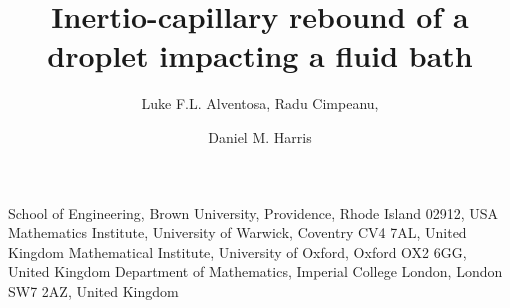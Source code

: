 \documentclass{jfm}
\begin{document}
\newtheorem{lemma}{Lemma}
\newtheorem{corollary}{Corollary}
\newcommand{\setbackgroundcolour}{\pagecolor[rgb]{0.19,0.19,.19}}  
\newcommand{\settextcolour}{\color[rgb]{0.77,0.77,0.77}}    
\newcommand{\invertbackgroundtext}{\setbackgroundcolour\settextcolour}

\newcommand{\Bo}{B\kern-0.04em o\,}
\newcommand{\Bos}{B\kern-0.04em o}
\newcommand{\We}{W\kern-0.03em e\,}
\newcommand{\Wes}{W\kern-0.03em e}
\newcommand{\Fr}{F\kern-0.04em r\,}
\newcommand{\Frs}{F\kern-0.04em r}
\newcommand{\Dr}{D\kern-0.04em r\,}
\newcommand{\Drs}{D\kern-0.04em r}
\newcommand{\Oh}{O\kern-0.04em h\,}


\title{Inertio-capillary rebound of a droplet impacting a fluid bath}

 \author
   {
   Luke F.L. Alventosa,
   Radu Cimpeanu,
   \and 
   Daniel M. Harris
   }

 \affiliation
 {
 School of Engineering, Brown University, Providence, Rhode Island 02912, USA
 Mathematics Institute, University of Warwick, Coventry CV4 7AL, United Kingdom
 Mathematical Institute, University of Oxford, Oxford OX2 6GG, United Kingdom
Department of Mathematics, Imperial College London, London SW7 2AZ, United Kingdom
}
\end{document}
